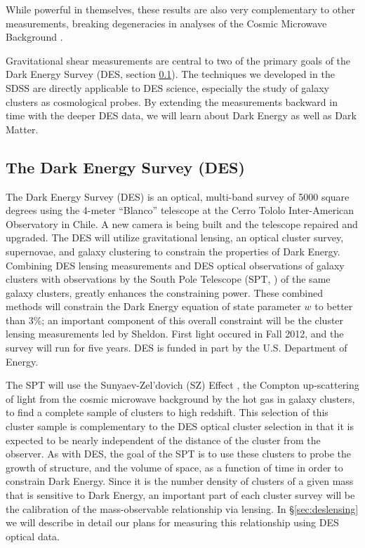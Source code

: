\documentclass[12pt]{article}
\newcommand{\commissdate}{Fall 2012}
\begin{document}
While powerful in themselves, these results are also very complementary to
other measurements, breaking degeneracies in analyses of the Cosmic Microwave
Background \cite{KomatsuWMAPCosmo09}. 

Gravitational shear measurements are central to two of the primary goals of the
Dark Energy Survey (DES, section \ref{sec:des}).  The techniques we developed
in the SDSS are directly applicable to DES science, especially the study of
galaxy clusters as cosmological probes.  By extending the measurements backward
in time with the deeper DES data, we will learn about Dark Energy as well as
Dark Matter.


\subsection{The Dark Energy Survey (DES)} \label{sec:des}

The Dark Energy Survey (DES) is an optical, multi-band survey of 5000 square
degrees using the 4-meter ``Blanco'' telescope at the Cerro Tololo
Inter-American Observatory in Chile. A new camera is being built and the
telescope repaired and upgraded.  The DES will utilize gravitational lensing,
an optical cluster survey, supernovae, and galaxy clustering to constrain the
properties of Dark Energy.  Combining DES lensing measurements and DES optical
observations of galaxy clusters with observations by the South Pole Telescope
(SPT, \cite{SPT04}) of the same galaxy clusters, greatly enhances the
constraining power.  These combined methods will constrain the Dark Energy
equation of state parameter $w$ to better than 3\%; an important component of
this overall constraint will be the cluster lensing measurements led by
Sheldon.  First light occured in \commissdate, and the survey will run for five
years.  DES is funded in part by the U.S. Department of Energy. 


The SPT will use the Sunyaev-Zel'dovich (SZ) Effect \cite{Birkinshaw99}, the
Compton up-scattering of light from the cosmic microwave background by the hot
gas in galaxy clusters, to find a complete sample of clusters to high redshift.
This selection of this cluster sample is complementary to the DES optical
cluster selection in that it is expected to be nearly independent of the
distance of the cluster from the observer.  As with DES, the goal of the SPT is
to use these clusters to probe the growth of structure, and the volume of
space, as a function of time in order to constrain Dark Energy.  Since it is
the number density of clusters of a given mass that is sensitive to Dark
Energy, an important part of each cluster survey will be the calibration of the
mass-observable relationship via lensing.  In \S \ref{sec:deslensing} we will
describe in detail our plans for measuring this relationship using DES optical
data.
\end{document}

